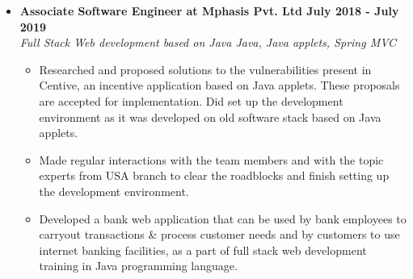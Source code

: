 \documentclass[a4paper,11pt]{article}
\newcommand{\isep}{-2 pt}
\newcommand{\spsep}{-0.75cm}
\begin{document}
\begin{itemize}
	\item \textbf{Associate Software Engineer at Mphasis Pvt. Ltd \hfill July 2018 - July 2019} \\
	\emph{Full Stack Web development based on Java \hfill Java, Java applets, Spring MVC} \\[\spsep]
		\begin{itemize} \itemsep \isep
		\item Researched and proposed solutions to the vulnerabilities present in Centive, an incentive application based on Java applets. These proposals are accepted for implementation. Did set up the development environment as it was developed on old software stack based on Java applets.
		\item Made regular interactions with the team members and with the topic experts from USA branch to clear the roadblocks and finish setting up the development environment.
		\item Developed a bank web application that can be used by bank employees to carryout transactions \& process customer needs and by customers to use internet banking facilities, as a part of full stack web development training in Java programming language.
		\end{itemize}
\fi
\end{itemize}
\end{document}
